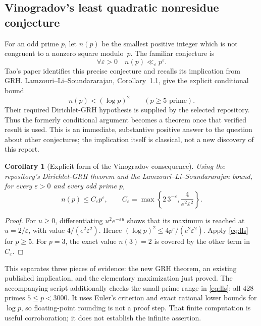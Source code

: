 \documentclass[11pt,letterpaper]{article}
\newtheorem{corollary}[theorem]{Corollary}
\theoremstyle{definition}\newtheorem{definition}[theorem]{Definition}
\theoremstyle{remark}\newtheorem{remark}[theorem]{Remark}
\begin{document}
\subsection{Vinogradov's least quadratic nonresidue conjecture}
For an odd prime $p$, let $n(p)$ be the smallest positive integer which is not congruent to a
nonzero square modulo~$p$. The familiar conjecture is
\begin{equation}\label{eq:vinogradov}
  \forall\varepsilon>0\quad n(p)\ll_\varepsilon p^\varepsilon.
\end{equation}
Tao's paper identifies this precise conjecture and recalls its implication from GRH.
Lamzouri--Li--Soundararajan, Corollary~1.1, give the explicit conditional bound
\begin{equation}\label{eq:lls}
  n(p)<(\log p)^2\qquad(p\ge5\text{ prime}).
\end{equation}
Their required Dirichlet-GRH hypothesis is supplied by the selected repository.
Thus the formerly conditional argument becomes a theorem once that verified result is used.
This is an immediate, substantive positive answer to the question about other conjectures;
the implication itself is classical, not a new discovery of this report.\cite{tao,lls}

\begin{corollary}[Explicit form of the Vinogradov consequence]\label{cor:vinogradov}
Using the repository's Dirichlet-GRH theorem and the Lamzouri--Li--Soundararajan bound, for every
$\varepsilon>0$ and every odd prime $p$,
\[
 n(p)\le C_\varepsilon p^\varepsilon,
 \qquad C_\varepsilon=
 \max\left\{2\,3^{-\varepsilon},\frac{4}{e^2\varepsilon^2}\right\}.
\]
\end{corollary}
\begin{proof}
For $u\ge0$, differentiating $u^2e^{-\varepsilon u}$ shows that its maximum is reached at
$u=2/\varepsilon$, with value $4/(e^2\varepsilon^2)$. Hence
$(\log p)^2\le4p^\varepsilon/(e^2\varepsilon^2)$. Apply \eqref{eq:lls} for $p\ge5$.
For $p=3$, the exact value $n(3)=2$ is covered by the other term in $C_\varepsilon$.
\end{proof}

This separates three pieces of evidence: the new GRH theorem, an existing published implication,
and the elementary maximization just proved. The accompanying script additionally checks the
small-prime range in \eqref{eq:lls}: all 428 primes $5\le p<3000$. It uses Euler's criterion and
exact rational lower bounds for $\log p$, so floating-point rounding is not a proof step.
That finite computation is useful corroboration; it does not establish the infinite assertion.
\end{document}
